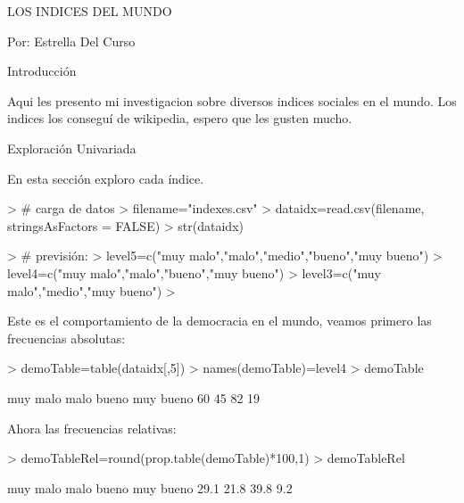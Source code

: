 \documentclass{article}
\begin{document}


LOS INDICES DEL MUNDO


Por: Estrella Del Curso


Introducción

Aqui les presento mi investigacion sobre diversos indices sociales en el mundo. Los indices los conseguí de wikipedia, espero que les gusten mucho.


Exploración Univariada

En esta sección exploro cada índice.


\begin{Schunk}
\begin{Sinput}
> # carga de datos
> filename="indexes.csv"
> dataidx=read.csv(filename, stringsAsFactors = FALSE)
> str(dataidx)
\end{Sinput}
\begin{Sinput}
> # previsión:
> level5=c("muy malo","malo","medio","bueno","muy bueno")
> level4=c("muy malo","malo","bueno","muy bueno")
> level3=c("muy malo","medio","muy bueno")
> 
\end{Sinput}
\end{Schunk}


Este es el comportamiento de la democracia en el mundo, veamos primero las frecuencias absolutas:
\begin{Schunk}
\begin{Sinput}
> demoTable=table(dataidx[,5])
> names(demoTable)=level4
> demoTable
\end{Sinput}
\begin{Soutput}
 muy malo      malo     bueno muy bueno 
       60        45        82        19 
\end{Soutput}
\end{Schunk}

Ahora las frecuencias relativas:
\begin{Schunk}
\begin{Sinput}
> demoTableRel=round(prop.table(demoTable)*100,1)
> demoTableRel
\end{Sinput}
\begin{Soutput}
 muy malo      malo     bueno muy bueno 
     29.1      21.8      39.8       9.2 
\end{Soutput}
\end{Schunk}
\end{document}
